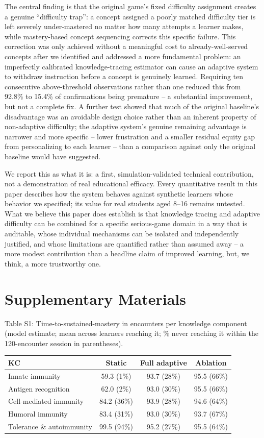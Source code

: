 \documentclass[11pt]{article}
\begin{document}
The central finding is that the original game's fixed difficulty assignment creates a genuine ``difficulty trap'': a concept assigned a poorly matched difficulty tier is left severely under-mastered no matter how many attempts a learner makes, while mastery-based concept sequencing corrects this specific failure. This correction was only achieved without a meaningful cost to already-well-served concepts after we identified and addressed a more fundamental problem: an imperfectly calibrated knowledge-tracing estimator can cause an adaptive system to withdraw instruction before a concept is genuinely learned. Requiring ten consecutive above-threshold observations rather than one reduced this from 92.8\% to 15.4\% of confirmations being premature -- a substantial improvement, but not a complete fix. A further test showed that much of the original baseline's disadvantage was an avoidable design choice rather than an inherent property of non-adaptive difficulty; the adaptive system's genuine remaining advantage is narrower and more specific -- lower frustration and a smaller residual equity gap from personalizing to each learner -- than a comparison against only the original baseline would have suggested.

We report this as what it is: a first, simulation-validated technical contribution, not a demonstration of real educational efficacy. Every quantitative result in this paper describes how the system behaves against synthetic learners whose behavior we specified; its value for real students aged 8--16 remains untested. What we believe this paper does establish is that knowledge tracing and adaptive difficulty can be combined for a specific serious-game domain in a way that is auditable, whose individual mechanisms can be isolated and independently justified, and whose limitations are quantified rather than assumed away -- a more modest contribution than a headline claim of improved learning, but, we think, a more trustworthy one.

\section*{Supplementary Materials}
Table S1: Time-to-sustained-mastery in encounters per knowledge component (model estimate; mean across learners reaching it; \% never reaching it within the 120-encounter session in parentheses).

\begin{table}[h]
\centering
\begin{tabular}{@{}lccc@{}}
\toprule
KC & Static & Full adaptive & Ablation \\
\midrule
Innate immunity & 59.3 (1\%) & 93.7 (28\%) & 95.5 (66\%) \\
Antigen recognition & 62.0 (2\%) & 93.0 (30\%) & 95.5 (66\%) \\
Cell-mediated immunity & 84.2 (36\%) & 93.9 (28\%) & 94.6 (64\%) \\
Humoral immunity & 83.4 (31\%) & 93.0 (30\%) & 93.7 (67\%) \\
Tolerance \& autoimmunity & 99.5 (94\%) & 95.2 (27\%) & 95.5 (64\%) \\
\bottomrule
\end{tabular}
\end{table}
\end{document}
